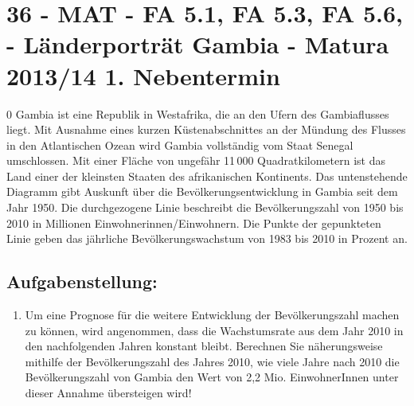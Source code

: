 \section{36 - MAT - FA 5.1, FA 5.3, FA 5.6,  - Länderporträt Gambia - Matura 2013/14 1. Nebentermin}

\begin{langesbeispiel} \item[0] %
				Gambia ist eine Republik in Westafrika, die an den Ufern des Gambiaflusses liegt. Mit Ausnahme eines kurzen Küstenabschnittes an der Mündung des Flusses in den Atlantischen Ozean wird Gambia vollständig vom Staat Senegal umschlossen. Mit einer Fläche von ungefähr 11\,000  Quadratkilometern ist das Land einer der kleinsten Staaten des afrikanischen Kontinents. Das untenstehende Diagramm gibt Auskunft über die Bevölkerungsentwicklung in Gambia seit dem Jahr 1950. Die durchgezogene Linie beschreibt die Bevölkerungszahl von 1950 bis 2010 in Millionen Einwohnerinnen/Einwohnern. Die Punkte der gepunkteten Linie geben das jährliche Bevölkerungswachstum von 1983 bis 2010 in Prozent an.
				

				
\subsection{Aufgabenstellung:}
\begin{enumerate}
	\item Um eine Prognose für die weitere Entwicklung der Bevölkerungszahl machen zu können, wird angenommen, dass die Wachstumsrate aus dem Jahr 2010 in den nachfolgenden Jahren konstant bleibt. Berechnen Sie näherungsweise mithilfe der Bevölkerungszahl des Jahres 2010, wie viele Jahre nach 2010 die Bevölkerungszahl von Gambia den Wert von 2,2 Mio. EinwohnerInnen unter dieser Annahme übersteigen wird!
	

\end{enumerate}
\end{langesbeispiel}
